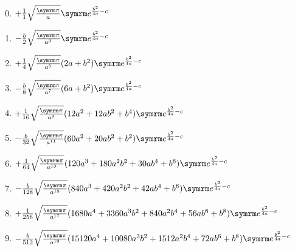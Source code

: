 \everymath{\displaystyle}
\begin{enumerate}[label = {$n = \arabic*$:}]
    \setcounter{enumi}{-1}
    \item $+\frac{1}{1}\sqrt{\frac{\cpi}{a}}\e^{\frac{b^2}{4a} - c}$
    \item $-\frac{b}{2}\sqrt{\frac{\cpi}{a^3}} \e^{\frac{b^2}{4a} - c}$
    \item $+\frac{1}{4}\sqrt{\frac{\cpi}{a^5}} (2a + b^2) \e^{\frac{b^2}{4a} - c}$
    \item $-\frac{b}{8}\sqrt{\frac{\cpi}{a^7}} (6a + b^2) \e^{\frac{b^2}{4a} - c}$
    \item $+\frac{1}{16}\sqrt{\frac{\cpi}{a^9}} (12a^2 + 12ab^2 + b^4)\e^{\frac{b^2}{4a} - c}$
    \item $-\frac{b}{32}\sqrt{\frac{\cpi}{a^{11}}} (60a^2 + 20ab^2 + b^2)\e^{\frac{b^2}{4a} - c}$
    \item $+\frac{1}{64}\sqrt{\frac{\cpi}{a^{13}}} (120a^3 + 180a^2b^2 + 30ab^4 + b^6)\e^{\frac{b^2}{4a} - c}$
    \item $-\frac{b}{128}\sqrt{\frac{\cpi}{a^{15}}} (840a^3 + 420a^2b^2 + 42ab^4 + b^6)\e^{\frac{b^2}{4a} - c}$
    \item $+\frac{1}{256}\sqrt{\frac{\cpi}{a^{17}}} (1680a^4 + 3360a^3b^2 + 840a^2b^4 + 56ab^6 + b^8)\e^{\frac{b^2}{4a} - c}$
    \item $-\frac{b}{512}\sqrt{\frac{\cpi}{a^{19}}} (15120a^4 + 10080a^3b^2 + 1512a^2b^4 + 72ab^6 + b^8)\e^{\frac{b^2}{4a} - c}$
\end{enumerate}